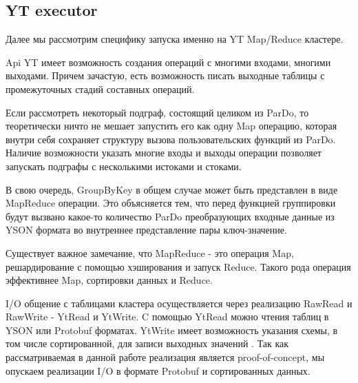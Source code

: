 \subsection{YT executor}

Далее мы рассмотрим специфику запуска именно на YT Map/Reduce кластере.

Api YT имеет возможность создания операций с многими входами, многими выходами. Причем зачастую, есть возможность писать выходные таблицы с промежуточных стадий составных операций.

Если рассмотреть некоторый подграф, состоящий целиком из ParDo, то теоретически ничто не мешает запустить его как одну Map операцию, которая внутри себя сохраняет структуру вызова пользовательских функций из ParDo. Наличие возможности указать многие входы и выходы операции позволяет запускать подграфы с несколькими истоками и стоками.

В свою очередь, GroupByKey в общем случае может быть представлен в виде MapReduce операции. Это объясняется тем, что перед функцией группировки будут вызвано какое-то количество ParDo преобразующих входные данные из YSON \cite{yson} формата во внутреннее представление пары ключ-значение.

Существует важное замечание, что MapReduce - это операция Map, решардирование с помощью хэширования и запуск Reduce. Такого рода операция эффективнее Map, сортировки данных и Reduce.

I/O общение с таблицами кластера осуществляется через реализацию RawRead и RawWrite - YtRead и YtWrite. C помощью YtRead можно чтения таблиц в YSON или Protobuf \cite{protobuf} форматах. YtWrite имеет возможность указания схемы, в том числе сортированной, для записи выходных значений \cite{io}. Так как рассматриваемая в данной работе реализация является proof-of-concept, мы опускаем реализации I/O в формате Protobuf и сортированных данных.

